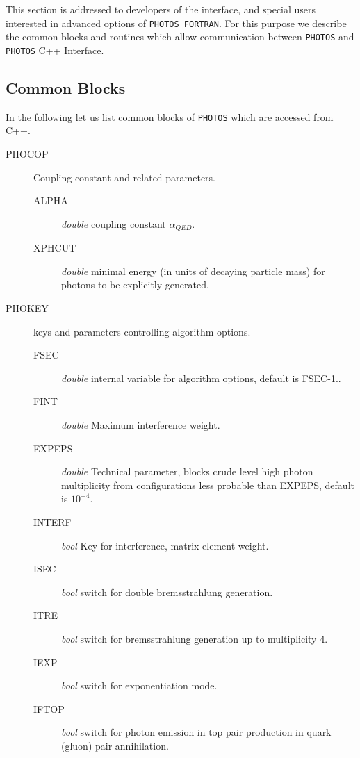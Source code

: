 \documentclass[]{Photos_interface_design}
\begin{document}
This section is addressed to developers of the interface, 
and special users interested in advanced options of {\tt PHOTOS FORTRAN}.
For this purpose we describe the common blocks and routines which allow
communication between {\tt PHOTOS} and {\tt PHOTOS} C++ Interface.

\subsection{Common Blocks}

In the following let us list common blocks of {\tt PHOTOS} which are accessed
from C++.

\begin{description}
\item[PHOCOP] Coupling constant and related parameters.
    \begin{description}
	\item[ALPHA]  \textit{double}  coupling constant $\alpha_{QED}$.
	\item[XPHCUT] \textit{double} minimal energy (in units of decaying particle mass) for photons to be explicitly generated.
    \end{description}
\end{description}

\begin{description}
\item[PHOKEY] keys and parameters controlling algorithm options.
    \begin{description}
	\item[FSEC]   \textit{double} internal variable for algorithm options, default is FSEC-1..
	\item[FINT]   \textit{double} Maximum interference weight.
	\item[EXPEPS] \textit{double} Technical parameter, blocks crude level high photon multiplicity from configurations less probable than EXPEPS, default is $10^{-4}$.
	\item[INTERF] \textit{bool} Key for interference, matrix element weight.
	\item[ISEC]   \textit{bool} switch for double bremsstrahlung generation.
	\item[ITRE]   \textit{bool} switch for bremsstrahlung generation up to multiplicity 4.
	\item[IEXP]   \textit{bool} switch for exponentiation mode.
	\item[IFTOP]  \textit{bool} switch for photon emission in top pair production in quark (gluon) pair annihilation.
    \end{description}
\end{description}
\end{document}
